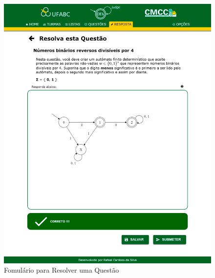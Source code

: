 \documentclass[plainsections, a0,  25pt]{sciposter} %
\begin{document}
\begin{multicols}{3}
\begin{figure}
    \vspace{-0.5cm}
  \centering
  \includegraphics[width=\linewidth]{alunoResposta}
    \vspace{-0.5cm}
  \caption{Fomulário para Resolver uma Questão}
  \label{fig:alunoResposta}
  \vspace{-2cm}
\end{figure}




\end{multicols}
\end{document}

